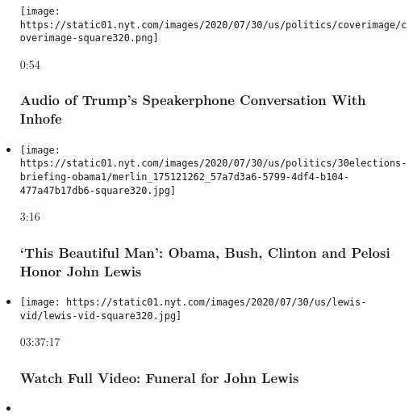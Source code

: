 \begin{itemize}
  \texttt{[image: https://static01.nyt.com/images/2020/07/30/us/politics/coverimage/coverimage-square320.png]}

  0:54

  \hypertarget{audio-of-trumps-speakerphone-conversation-with-inhofe}{%
  \subsubsection{Audio of Trump's Speakerphone Conversation With
  Inhofe}\label{audio-of-trumps-speakerphone-conversation-with-inhofe}}
\item
  \href{https://www.nytimes.com/video/us/politics/100000007264823/john-lewis-funeral.html?action=click\&module=video-series-bar\&region=header\&pgtype=Article\&playlistId=video/us-politics}{}

  \texttt{[image: https://static01.nyt.com/images/2020/07/30/us/politics/30elections-briefing-obama1/merlin\_175121262\_57a7d3a6-5799-4df4-b104-477a47b17db6-square320.jpg]}

  3:16

  \hypertarget{this-beautiful-man-obama-bush-clinton-and-pelosi-honor-john-lewis}{%
  \subsubsection{`This Beautiful Man': Obama, Bush, Clinton and Pelosi
  Honor John
  Lewis}\label{this-beautiful-man-obama-bush-clinton-and-pelosi-honor-john-lewis}}
\item
  \href{https://www.nytimes.com/video/us/politics/100000007264379/john-lewis-funeral.html?action=click\&module=video-series-bar\&region=header\&pgtype=Article\&playlistId=video/us-politics}{}

  \texttt{[image: https://static01.nyt.com/images/2020/07/30/us/lewis-vid/lewis-vid-square320.jpg]}

  03:37:17

  \hypertarget{watch-full-video-funeral-for-john-lewis}{%
  \subsubsection{Watch Full Video: Funeral for John
  Lewis}\label{watch-full-video-funeral-for-john-lewis}}
\item
  \href{https://www.nytimes.com/video/us/politics/100000007261010/barr-johnson-roger-stone-trump.html?action=click\&module=video-series-bar\&region=header\&pgtype=Article\&playlistId=video/us-politics}{}


\end{itemize}
